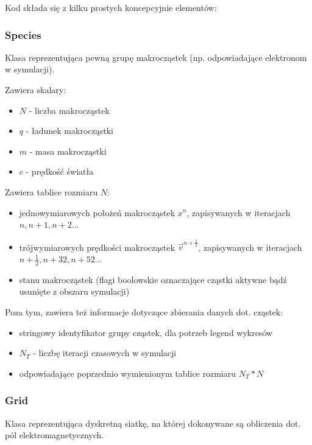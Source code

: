Kod składa się z kilku prostych koncepcyjnie elementów:

\subsubsection{Species}
Klasa reprezentująca pewną grupę makrocząstek (np. odpowiadające elektronom w symulacji).

Zawiera skalary:
\begin{itemize}
\item $N$ - liczba makrocząstek
\item $q$ - ładunek makrocząstki
\item $m$ - masa makrocząstki
\item $c$ - prędkość światła
\end{itemize}

Zawiera tablice rozmiaru $N$:
\begin{itemize}
\item jednowymiarowych położeń makrocząstek $x^n$, zapisywanych w iteracjach $n, n+1, n+2$...
\item trójwymiarowych prędkości makrocząstek $\vec{v}^{n+\frac{1}{2}}$, zapisywanych w iteracjach $n+\frac{1}{2}, n+{3}{2}, n+{5}{2}$...
\item stanu makrocząstek (flagi boolowskie oznaczające cząstki aktywne bądź usunięte z obszaru symulacji)
\end{itemize}

Poza tym, zawiera też informacje dotyczące zbierania danych dot. cząstek:
\begin{itemize}
    \item stringowy identyfikator grupy cząstek, dla potrzeb legend wykresów
    \item $N_T$ - liczbę iteracji czasowych w symulacji
    \item odpowiadające poprzednio wymienionym tablice rozmiaru $N_T * N$
\end{itemize}


\subsubsection{Grid}
Klasa reprezentująca dyskretną siatkę, na której dokonywane są obliczenia dot. pól elektromagnetycznych.


